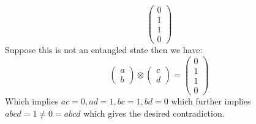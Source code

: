 \documentclass[12pt]{article}
\begin{document}
\begin{enumerate}[font=\bfseries]
\[\begin{pmatrix}
            0 \\ 1 \\ 1 \\ 0
            \end{pmatrix}
            \]
        Suppose this is not an entangled state then we have:
        \[\begin{pmatrix}
        a \\b
        \end{pmatrix}
        \otimes
        \begin{pmatrix}
        c \\d
        \end{pmatrix}
        =
        \begin{pmatrix}
        0 \\ 1 \\ 1 \\ 0
        \end{pmatrix}
        \]
        Which implies $ac = 0, ad = 1, bc = 1, bd = 0$ which further implies $abcd = 1 \neq 0 = abcd$ which gives the desired contradiction.
        

\end{enumerate}
\end{document}
